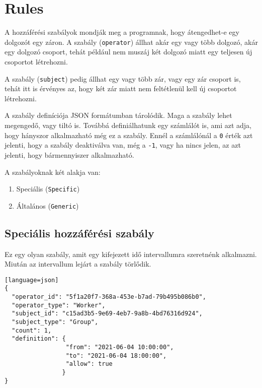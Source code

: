 \documentclass[a4paper,12pt]{thesis-ekf}
\theoremstyle{definition}
\begin{document}
		\section{Rules}
			A hozzáférési szabályok mondják meg a programnak, hogy átengedhet-e egy dolgozót egy záron. A szabály  (\texttt{operator}) állhat akár egy vagy több dolgozó, akár egy dolgozó csoport, tehát például nem muszáj két dolgozó miatt egy teljesen új csoportot létrehozni. 
			
			A szabály  (\texttt{subject}) pedig állhat egy vagy több zár, vagy egy zár csoport is, tehát itt is érvényes az, hogy két zár miatt nem feltétlenül kell új csoportot létrehozni.
			
			A szabály definíciója JSON formátumban tárolódik. Maga a szabály lehet megengedő, vagy tiltó is. Továbbá definiálhatunk egy számlálót is, ami azt adja, hogy hányszor alkalmazható még ez a szabály. Ennél a számlálónál a \texttt{0} érték azt jelenti, hogy a szabály deaktiválva van, még a \texttt{-1}, vagy ha nincs jelen, az azt jelenti, hogy bármennyiszer alkalmazható.
			
			A szabályoknak két alakja van:
			\begin{enumerate}
				\item Speciális (\texttt{Specific})
				\item Általános (\texttt{Generic})
			\end{enumerate}
		
			\subsection{Speciális hozzáférési szabály}
				Ez egy olyan szabály, amit egy kifejezett idő intervallumra szeretnénk alkalmazni. Miután az intervallum lejárt a szabály törlődik.
				
				\begin{lstlisting}[caption={Egy példa speciális szabály létrehozása}][language=json]
{
  "operator_id": "5f1a20f7-368a-453e-b7ad-79b495b086b0",
  "operator_type": "Worker",
  "subject_id": "c15ad3b5-9e69-4eb7-9a8b-4bd76316d924",
  "subject_type": "Group",
  "count": 1,
  "definition": {
                 "from": "2021-06-04 10:00:00",
                 "to": "2021-06-04 18:00:00",
                 "allow": true
                }
}
				\end{lstlisting}
				
\end{document}
